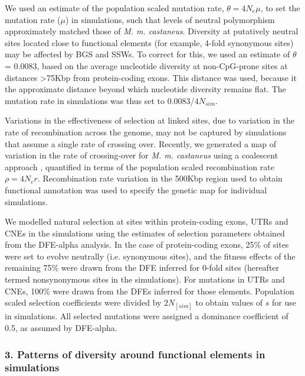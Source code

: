	We used an estimate of the population scaled mutation rate, $\theta = 4N_e \mu$, to set the mutation rate ($\mu$) in simulations, such that levels of neutral polymorphism approximately matched those of \textit{M. m. castaneus}. Diversity at putatively neutral sites located close to functional elements (for example, 4-fold synonymous sites) may be affected by BGS and SSWs. To correct for this, we used an estimate of $\theta$ = 0.0083, based on the average nucleotide diversity at non-CpG-prone sites at distances >75Kbp from protein-coding exons. This distance was used, because it the approximate distance beyond which nucleotide diversity remains flat. The mutation rate in simulations was thus set to 0.0083/$4N_{sim}$. 

	Variations in the effectiveness of selection at linked sites, due to variation in the rate of recombination across the genome, may not be captured by simulations that assume a single rate of crossing over. Recently, we generated a map of variation in the rate of crossing-over for \textit{M. m. castaneus} using a coalescent approach \citep{RN340}, quantified in terms of the population scaled recombination rate $\rho = 4N_er$. Recombination rate variation in the 500Kbp region used to obtain functional annotation was used to specify the genetic map for individual simulations. 

	We modelled natural selection at sites within protein-coding exons, UTRs and CNEs in the simulations using the estimates of selection parameters obtained from the DFE-alpha analysis. In the case of protein-coding exons, 25\% of sites were set to evolve neutrally (i.e. synonymous sites), and the fitness effects of the remaining 75\% were drawn from the DFE inferred for 0-fold sites (hereafter termed nonsynonymous sites in the simulations). For mutations in UTRs and CNEs, 100\% were drawn from the DFEs inferred for those elements. Population scaled selection coefficients were divided by $2N_[sim]$ to obtain values of $s$ for use in simulations. All selected mutations were assigned a dominance coefficient of 0.5, as assumed by DFE-alpha.
 
\subsubsection{3. Patterns of diversity around functional elements in simulations}
 

